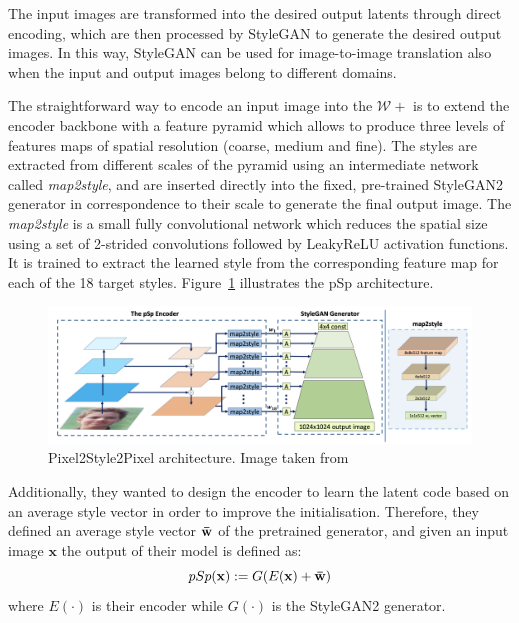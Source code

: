 \noindent The input images are transformed into the desired output latents through direct encoding, which are then processed by StyleGAN to generate the desired output images. In this way, StyleGAN can be used for image-to-image translation also when the input and output images belong to different domains.

\noindent The straightforward way to encode an input image into the $\mathcal{W}+$ is to extend the encoder backbone with a feature pyramid which allows to produce three levels of features maps of spatial resolution (coarse, medium and fine).
%
The styles are extracted from different scales of the pyramid using an intermediate network called \textit{map2style}, and are inserted directly into the fixed, pre-trained StyleGAN2 generator in correspondence to their scale to generate the final output image.
The \textit{map2style} is a small fully convolutional network which reduces the spatial size using a set of 2-strided convolutions followed by LeakyReLU activation functions. It is trained to extract the learned style from the corresponding feature map for each of the 18 target styles. Figure~\ref{fig:pSp encoder architecture} illustrates the pSp architecture.
 \begin{figure}[htbp]
\centering
  \includegraphics[scale=0.43]{figures/psp-architecture.png}
  \caption{Pixel2Style2Pixel architecture. Image taken from \cite{pSp}}
  \label{fig:pSp encoder architecture}
\end{figure}

\noindent Additionally, they wanted to design the encoder to learn the latent code based on an average style vector in order to improve the initialisation. Therefore, they defined an average style vector $\mathbf{\Bar{w}}$ of the pretrained generator, and given an input image $\mathbf{x}$ the output of their model is defined as:
\begin{equation}
    pSp(\mathbf{x}) := G(E(\mathbf{x}) + \mathbf{\Bar{w}})
\end{equation}
where $E(\cdot)$ is their encoder while $G(\cdot)$ is the StyleGAN2 generator.

